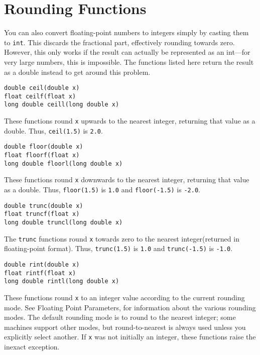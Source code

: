 \documentclass[12pt, titlepage]{article}
\renewcommand{\tt}[1]{\texttt{\small #1}}
\begin{document}
\newpage\tableofcontents

\newpage
\section{Rounding Functions}

You can also convert floating-point numbers to integers simply by casting them to \tt{int}. This discards the fractional part, effectively rounding towards zero. However, this only works if the result can actually be represented as an int—for very large numbers, this is impossible. The functions listed here return the result as a double instead to get around this problem.

\begin{verbatim}
double ceil(double x)
float ceilf(float x)
long double ceill(long double x)
\end{verbatim}
These functions round \tt{x} upwards to the nearest integer, returning that value as a double. Thus, \tt{ceil(1.5)} is \tt{2.0}.

\begin{verbatim}
double floor(double x)
float floorf(float x)
long double floorl(long double x)
\end{verbatim}
These functions round \tt{x} downwards to the nearest integer, returning that value as a double. Thus, \tt{floor(1.5)} is \tt{1.0} and \tt{floor(-1.5)} is \tt{-2.0}.

\begin{verbatim}
double trunc(double x)
float truncf(float x)
long double truncl(long double x)
\end{verbatim}
The \tt{trunc} functions round \tt{x} towards zero to the nearest integer(returned in floating-point format). Thus, \tt{trunc(1.5)} is \tt{1.0} and \tt{trunc(-1.5)} is \tt{-1.0}.

\begin{verbatim}
double rint(double x)
float rintf(float x)
long double rintl(long double x)
\end{verbatim}
These functions round \tt{x} to an integer value according to the current rounding mode. See Floating Point Parameters, for information about the various rounding modes. The default rounding mode is to round to the nearest integer; some machines support other modes, but round-to-nearest is always used unless you explicitly select another. If \tt{x} was not initially an integer, these functions raise the inexact exception.
\end{document}
